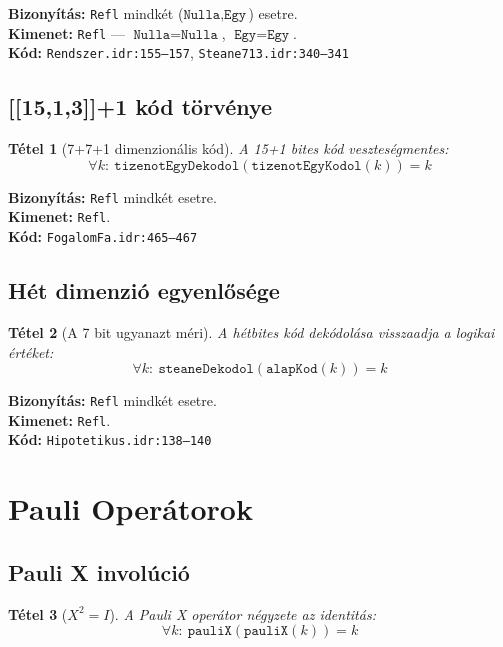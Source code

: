 \documentclass[12pt,a4paper]{article}
\newtheorem{tetel}{Tétel}
\begin{document}
\textbf{Bizonyítás:} \texttt{Refl} mindkét ($\texttt{Nulla}, \texttt{Egy}$) esetre.\\
\textbf{Kimenet:} \texttt{Refl} — $\texttt{Nulla} = \texttt{Nulla}$, $\texttt{Egy} = \texttt{Egy}$.\\
\textbf{Kód:} \texttt{Rendszer.idr:155--157}, \texttt{Steane713.idr:340--341}

\subsection{[[15,1,3]]+1 kód törvénye}

\begin{tetel}[7+7+1 dimenzionális kód]
A 15+1 bites kód veszteségmentes:
$$\forall k:\ \texttt{tizenotEgyDekodol}(\texttt{tizenotEgyKodol}(k)) = k$$
\end{tetel}

\textbf{Bizonyítás:} \texttt{Refl} mindkét esetre.\\
\textbf{Kimenet:} \texttt{Refl}.\\
\textbf{Kód:} \texttt{FogalomFa.idr:465--467}

\subsection{Hét dimenzió egyenlősége}

\begin{tetel}[A 7 bit ugyanazt méri]
A hétbites kód dekódolása visszaadja a logikai értéket:
$$\forall k:\ \texttt{steaneDekodol}(\texttt{alapKod}(k)) = k$$
\end{tetel}

\textbf{Bizonyítás:} \texttt{Refl} mindkét esetre.\\
\textbf{Kimenet:} \texttt{Refl}.\\
\textbf{Kód:} \texttt{Hipotetikus.idr:138--140}

\section{Pauli Operátorok}

\subsection{Pauli X involúció}

\begin{tetel}[$X^2 = I$]
A Pauli X operátor négyzete az identitás:
$$\forall k:\ \texttt{pauliX}(\texttt{pauliX}(k)) = k$$
\end{tetel}
\end{document}
